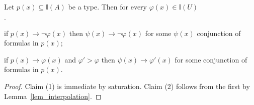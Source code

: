 \documentclass[10pt,oneside]{amsproc}
\newcommand{\mylabel}[1]{{#1}\hfill}
\renewenvironment{itemize}
  {\begin{list}{$\cdot$}{%
  \setlength{\parskip}{0mm}
  \setlength{\topsep}{.4\baselineskip}
  \setlength{\rightmargin}{0mm}
  \setlength{\listparindent}{0mm}
  \setlength{\itemindent}{0mm}
  \setlength{\labelwidth}{3ex}
  \setlength{\itemsep}{.2\baselineskip}
  \setlength{\parsep}{.2\baselineskip}
  \setlength{\partopsep}{0mm}
  \setlength{\labelsep}{1ex}
  \setlength{\leftmargin}{\labelwidth+\labelsep}
  \let\makelabel\mylabel}}{%
\end{list}}
\begin{document}

\begin{fact}\label{fact_compactness_imp}
  Let $p(x)\subseteq\mathds{I}(A)$ be a type.
  Then for every  $\varphi(x)\in\mathds{I}(U)$
  \begin{itemize}
    \item[1.] if $p(x)\rightarrow\neg\varphi(x)$ then $\psi(x)\rightarrow\neg\varphi(x)$ for some $\psi(x)$ conjunction of formulas in $p(x)$;
    \item[2.] if $p(x)\rightarrow\varphi(x)$ and $\varphi'>\varphi$ then $\psi(x)\rightarrow\varphi'(x)$ for some conjunction of formulas in $p(x)$.
  \end{itemize} 
\end{fact}

\begin{proof}
  Claim (1) is immediate by saturation.
  Claim (2) follows from the first by Lemma~\ref{lem_interpolation}.
\end{proof}



  






\end{document}
